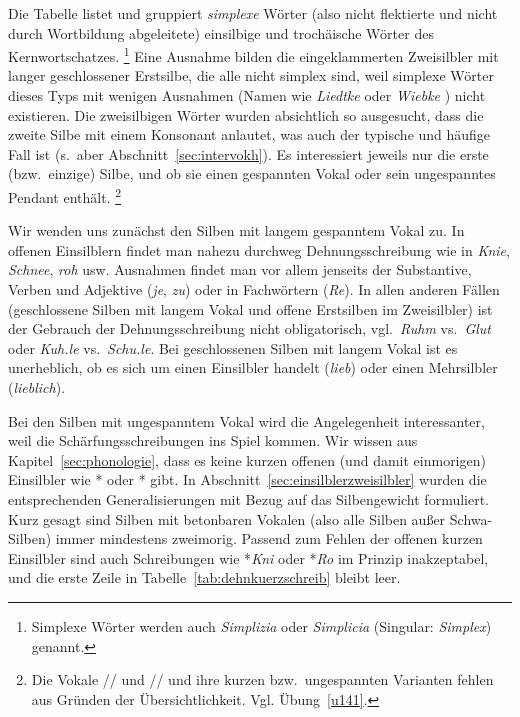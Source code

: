 Die Tabelle listet und gruppiert \textit{simplexe} Wörter (also nicht flektierte und nicht durch Wortbildung abgeleitete) einsilbige und trochäische Wörter des Kernwortschatzes.%
\footnote{Simplexe Wörter werden auch \textit{Simplizia} oder \textit{Simplicia} (Singular: \textit{Simplex}) genannt.}
Eine Ausnahme bilden die eingeklammerten Zweisilbler mit langer geschlossener Erstsilbe, die alle nicht simplex sind, weil simplexe Wörter dieses Typs mit wenigen Ausnahmen (\zB Namen wie \textit{Liedtke} \textipa{[li:tk@]} oder \textit{Wiebke} \textipa{[vi:pk@]}) nicht existieren.\label{abs:wiebke}
Die zweisilbigen Wörter wurden absichtlich so ausgesucht, dass die zweite Silbe mit einem Konsonant anlautet, was auch der typische und häufige Fall ist (s.\ aber Abschnitt~\ref{sec:intervokh}).
Es interessiert jeweils nur die erste (bzw.\ einzige) Silbe, und ob sie einen gespannten Vokal oder sein ungespanntes Pendant enthält.%
\footnote{Die Vokale /\textipa{\o}/ und // und ihre kurzen bzw.\ ungespannten Varianten fehlen aus Gründen der Übersichtlichkeit.
Vgl. Übung~\ref{u141}.}

Wir wenden uns zunächst den Silben mit langem gespanntem Vokal zu.
In offenen Einsilblern findet man nahezu durchweg Dehnungsschreibung wie in \textit{Knie}, \textit{Schnee}, \textit{roh} usw.
Ausnahmen findet man vor allem jenseits der Substantive, Verben und Adjektive (\zB \textit{je}, \textit{zu}) oder in Fachwörtern (\zB \textit{Re}).
In allen anderen Fällen (geschlossene Silben mit langem Vokal und offene Erstsilben im Zweisilbler) ist der Gebrauch der Dehnungsschreibung nicht obligatorisch, vgl.\ \textit{Ruhm} vs.\ \textit{Glut} oder \textit{Kuh.le} vs.\ \textit{Schu.le}.
Bei geschlossenen Silben mit langem Vokal ist es unerheblich, ob es sich um einen Einsilbler handelt (\textit{lieb}) oder einen Mehrsilbler (\textit{lieblich}).

Bei den Silben mit ungespanntem Vokal wird die Angelegenheit interessanter, weil die Schärfungsschreibungen ins Spiel kommen.
Wir wissen aus Kapitel~\ref{sec:phonologie}, dass es keine kurzen offenen (und damit einmorigen) Einsilbler wie *\textipa{[knI]} oder *\textipa{[KO]} gibt.
In Abschnitt~\ref{sec:einsilblerzweisilbler} wurden die entsprechenden Generalisierungen mit Bezug auf das Silbengewicht formuliert.
Kurz gesagt sind Silben mit betonbaren Vokalen (also alle Silben außer Schwa-Silben) immer mindestens zweimorig.
Passend zum Fehlen der offenen kurzen Einsilbler sind auch Schreibungen wie *\textit{Kni} oder *\textit{Ro} im Prinzip inakzeptabel, und die erste Zeile in Tabelle~\ref{tab:dehnkuerzschreib} bleibt leer.

